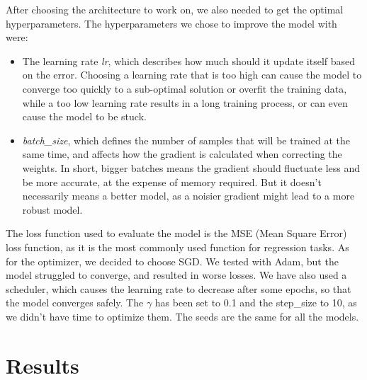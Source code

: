 \documentclass[10pt,conference]{IEEEtran}
\begin{document}
After choosing the architecture to work on, we also needed to get the optimal hyperparameters. The hyperparameters we chose to improve the model with were:
\begin{itemize}
  \item The learning rate \textit{lr}, which describes how much should it update itself based on the error. Choosing a learning rate that is too high can cause the model to converge too quickly to a sub-optimal solution or overfit the training data, while a too low learning rate results in a long training process, or can even cause the model to be stuck.
  \item \textit{batch\_size}, which defines the number of samples that will be trained at the same time, and affects how the gradient is calculated when correcting the weights. In short, bigger batches means the gradient should fluctuate less and be more accurate, at the expense of memory required. But it doesn't necessarily means a better model, as a noisier gradient might lead to a more robust model.
\end{itemize}
 
The loss function used to evaluate the model is the MSE (Mean Square Error) loss function, as it is the most commonly used function for regression tasks. As for the optimizer, we decided to choose SGD. We tested with Adam, but the model struggled to converge, and resulted in worse losses. We have also used a scheduler, which causes the learning rate to decrease after some epochs, so that the model converges safely. The $\gamma$ has been set to 0.1 and the step\_size to 10, as we didn't have time to optimize them. The seeds are the same for all the models.


\section{Results}
\end{document}
